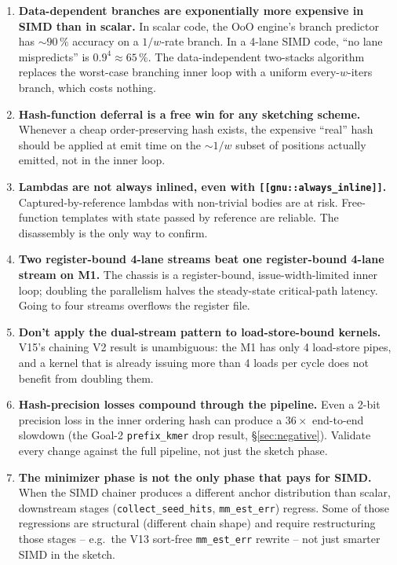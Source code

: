 \begin{enumerate}
\item \textbf{Data-dependent branches are exponentially more
  expensive in SIMD than in scalar.}  In scalar code, the OoO
  engine's branch predictor has $\sim 90\,\%$ accuracy on a
  $1/w$-rate branch.  In a 4-lane SIMD code, ``no lane mispredicts''
  is $0.9^4 \approx 65\,\%$.  The data-independent two-stacks
  algorithm replaces the worst-case branching inner loop with a
  uniform every-$w$-iters branch, which costs nothing.

\item \textbf{Hash-function deferral is a free win for any sketching
  scheme.}  Whenever a cheap order-preserving hash exists, the
  expensive ``real'' hash should be applied at emit time on the
  $\sim 1/w$ subset of positions actually emitted, not in the
  inner loop.

\item \textbf{Lambdas are not always inlined, even with
  \texttt{[[gnu::always\_inline]]}.}  Captured-by-reference lambdas
  with non-trivial bodies are at risk.  Free-function templates
  with state passed by reference are reliable.  The disassembly is
  the only way to confirm.

\item \textbf{Two register-bound 4-lane streams beat one
  register-bound 4-lane stream on M1.}  The chassis is a
  register-bound, issue-width-limited inner loop; doubling the
  parallelism halves the steady-state critical-path latency.  Going
  to four streams overflows the register file.

\item \textbf{Don't apply the dual-stream pattern to
  load-store-bound kernels.}  V15's chaining V2 result is
  unambiguous: the M1 has only 4 load-store pipes, and a kernel that
  is already issuing more than 4 loads per cycle does not benefit
  from doubling them.

\item \textbf{Hash-precision losses compound through the pipeline.}
  Even a 2-bit precision loss in the inner ordering hash can produce
  a $36\times$ end-to-end slowdown (the Goal-2 \texttt{prefix\_kmer}
  drop result, \S\ref{sec:negative}). Validate every change against
  the full pipeline, not just the sketch phase.

\item \textbf{The minimizer phase is not the only phase that pays
  for SIMD.}  When the SIMD chainer produces a different anchor
  distribution than scalar, downstream stages
  (\texttt{collect\_seed\_hits}, \texttt{mm\_est\_err}) regress.
  Some of those regressions are structural (different chain shape)
  and require restructuring those stages -- e.g.\ the V13
  sort-free \texttt{mm\_est\_err} rewrite -- not just smarter SIMD
  in the sketch.


\end{enumerate}
